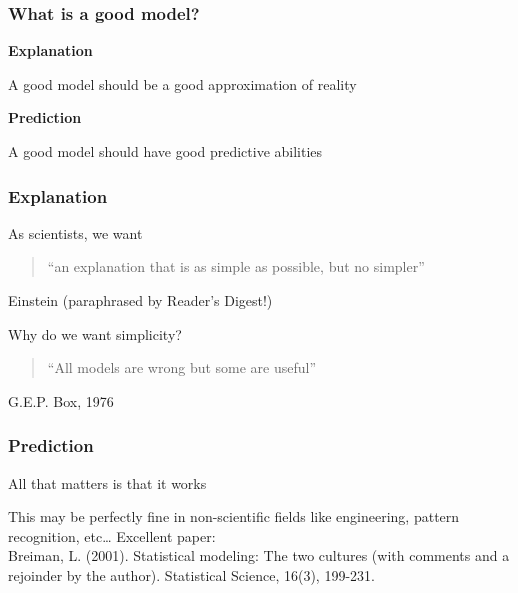 \documentclass[color=usenames,dvipsnames]{beamer}\usepackage[]{graphicx}\usepackage[]{color}
\begin{document}
\begin{frame}
  \frametitle{What is a good model?}
  \Large
  {\bf Explanation \par}
  A good model should be a good approximation of reality \\
  \pause
  \vspace{0.5cm}
  {\bf Prediction \par}
  A good model should have good predictive abilities
\end{frame}



\begin{frame}
  \frametitle{Explanation}
  \Large
As scientists, we want
\begin{quote}
  ``an explanation that is as simple as possible, but no simpler''
\end{quote}
{\small \flushright Einstein (paraphrased by Reader's Digest!) \par}
\pause
\vspace{1cm}
Why do we want simplicity?
\pause
\begin{quote}
  ``All models are wrong but some are useful''
\end{quote}
{\small \flushright G.E.P. Box, 1976 \par}
\end{frame}



\begin{frame}
  \frametitle{Prediction}
  \large
  All that matters is that it works \par
  \pause
  \vspace{1cm}
  This may be perfectly fine in non-scientific fields like
  engineering, pattern recognition, etc\dots
  \pause
  \vfill
  Excellent paper: \\
  \normalsize
  Breiman, L. (2001). Statistical modeling: The two cultures (with
  comments and a rejoinder by the author). Statistical Science, 16(3),
  199-231. \\
\end{frame}
\end{document}

